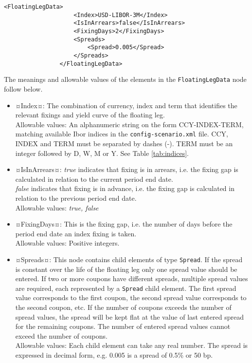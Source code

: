 {\footnotesize
\begin{lstlisting}[caption=FloatingLegData, label=lst:floatingleg_data]
                <FloatingLegData>
                    <Index>USD-LIBOR-3M</Index>
                    <IsInArrears>false</IsInArrears>
                    <FixingDays>2</FixingDays>
                    <Spreads>
                        <Spread>0.005</Spread>
                    </Spreads>
                </FloatingLegData>
\end{lstlisting}
}

The meanings and allowable values of the elements in the \lstinline!FloatingLegData! node follow below.

\begin{itemize}
\item ¤Index¤:  The combination of currency, index and term that identifies the relevant fixings and yield curve of the floating leg.  \\ Allowable values:  An alphanumeric string on the form CCY-INDEX-TERM,  matching available Ibor indices in the {\tt config-scenario.xml} file. CCY, INDEX and TERM must be separated by dashes (-). TERM must be an integer followed by D, W, M or Y. See Table \ref{tab:indices}.
\item ¤IsInArrears¤:  \emph{true} indicates that  fixing is in arrears, i.e. the fixing gap is calculated in relation to the current period end date.\\ \emph{false} indicates that  fixing is in advance, i.e. the fixing gap is calculated in relation to the previous period end date.  \\ Allowable values:  \emph{true, false}
\item ¤FixingDays¤: This is the fixing gap, i.e. the number of days before the period end date an index fixing is taken.   \\ Allowable values:  Positive integers.  
\item ¤Spreads¤: This node contains child elements of type \lstinline!Spread!. If the spread is constant over the life of the floating leg only one spread value should be entered. If two or more coupons have different spreads, multiple spread values are required, each represented by a \lstinline!Spread! child element. The first spread value corresponds to the first coupon, the second spread value corresponds to the second coupon, etc. If the number of coupons exceeds the number of spread values, the spread will be kept flat at the value of last entered spread for the remaining coupons.  The number of entered spread values cannot exceed the number of coupons. \\Allowable values: Each child element can take any  real number. The spread is expressed in decimal form, e.g. 0.005 is a spread of 0.5\% or 50 bp.
\end{itemize}

